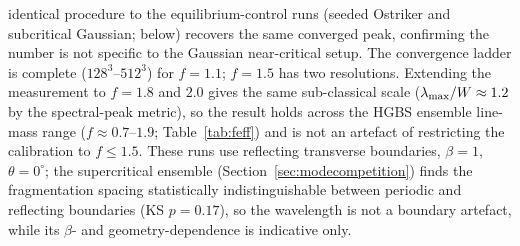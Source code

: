 \documentclass[usenatbib,twoside,twocolumn]{mnras}
\begin{document}
identical procedure to the equilibrium-control runs (seeded Ostriker and subcritical Gaussian; below) recovers the same converged peak, confirming the number is not specific to the Gaussian near-critical setup. The convergence ladder is complete ($128^3$--$512^3$) for $f=1.1$; $f=1.5$ has two resolutions. Extending the measurement to $f=1.8$ and $2.0$ gives the same sub-classical scale ($\lambda_{\rm max}/W\approx1.2$ by the spectral-peak metric), so the result holds across the HGBS ensemble line-mass range ($f\approx0.7$--$1.9$; Table~\ref{tab:feff}) and is not an artefact of restricting the calibration to $f\le1.5$. These runs use reflecting transverse boundaries, $\beta=1$, $\theta=0^\circ$; the supercritical ensemble (Section~\ref{sec:modecompetition}) finds the fragmentation spacing statistically indistinguishable between periodic and reflecting boundaries (KS $p=0.17$), so the wavelength is not a boundary artefact, while its $\beta$- and geometry-dependence is indicative only.
\end{document}
